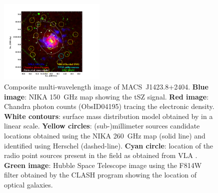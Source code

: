 \documentclass[twocolumn,traditabstract]{aa}
\begin{document}
\begin{figure}[h]
\centering
\includegraphics[trim=1cm 0cm 5cm 2cm, clip=true, width=0.45\textwidth]{Figure/MACSJ1424_multicolor.pdf}
\caption{Composite multi-wavelength image of \mbox{MACS~J1423.8+2404}. {\bf Blue image}: NIKA 150~GHz map showing the tSZ signal. {\bf Red image}: Chandra photon counts (ObsID04195) tracing the electronic density. {\bf White contours}: surface mass distribution model obtained by \cite{zitrin2011} in a linear scale. {\bf Yellow circles}: (sub-)millimeter sources candidate locations obtained using the NIKA 260~GHz map (solid line) and identified using Herschel (dashed-line). {\bf Cyan circle}: location of the radio point sources present in the field as obtained from VLA \citep{laroque2003}. {\bf Green image}: Hubble Space Telescope image using the F814W filter obtained by the CLASH  program \citep{postman2012} showing the location of optical galaxies.}
\label{fig:MACSJ1424_mutiw}
\end{figure}
\end{document}
